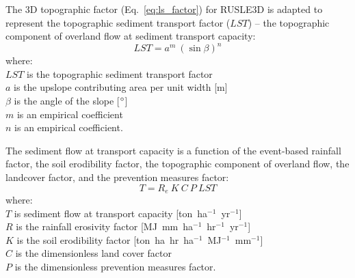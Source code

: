 \documentclass[gmd, manuscript]{copernicus}
\begin{document}
The 3D topographic factor (Eq.~\ref{eq:ls_factor}) 
for RUSLE3D is adapted to represent 
the topographic sediment transport factor ($LST$) --
the topographic component 
of overland flow at sediment transport capacity:
%
\begin{equation}
\label{eq:lst_factor}
{LST = a^{m} ~ (\sin \beta)^{n}}
\end{equation}
%
{\small
\noindent
where: \\
\noindent
\hspace*{0.5em} $LST$ is the topographic sediment transport factor\\
\hspace*{0.5em} $a$ is the upslope contributing area per unit width [m]\\
\hspace*{0.5em} $\beta$ is the angle of the slope [$^{\circ}$]\\
\hspace*{0.5em} $m$ is an empirical coefficient\\
\hspace*{0.5em} $n$ is an empirical coefficient.\\
}

\noindent
The sediment flow at transport capacity is a function of 
the event-based rainfall factor, the soil erodibility factor, 
the topographic component of overland flow,
the landcover factor, and the prevention measures factor:
%
\begin{equation}
\label{eq:usped}
{T = R_e ~ K ~ C ~ P ~ LST}
\end{equation}
{\small
\noindent
where: \\
\noindent
\hspace*{0.5em} $T$ is sediment flow at transport capacity [\unit{ton}~\unit{ha}$^{-1}$~\unit{yr}$^{-1}$]\\
\hspace*{0.5em} $R$ is the rainfall erosivity factor [\unit{MJ~mm~ha}$^{-1}$~\unit{hr}$^{-1}$~\unit{yr}$^{-1}$]\\
\hspace*{0.5em} $K$ is the soil erodibility factor [\unit{ton~ha~hr~ha}$^{-1}$~\unit{MJ}$^{-1}$~\unit{mm}$^{-1}$]\\ 
\hspace*{0.5em} $C$ is the dimensionless land cover factor\\
\hspace*{0.5em} $P$ is the dimensionless prevention measures factor.\\
}
\end{document}

